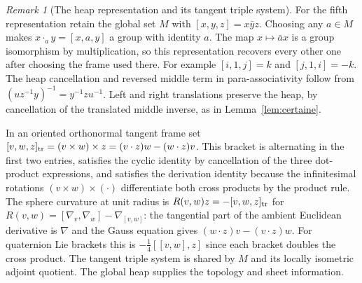 \documentclass[11pt,reqno]{amsart}
\theoremstyle{definition}
\theoremstyle{remark}
\newtheorem{remark}[theorem]{Remark}
\numberwithin{equation}{section}
\newcommand{\hp}[3]{[#1,#2,#3]}
\begin{document}
\begin{remark}[The heap representation and its tangent triple system]\label{m4:heap}
For the fifth representation retain the global set $M$ with $\hp xyz=x\bar yz$. Choosing any $a\in M$ makes $x\cdot_a y=\hp xay$ a group with identity $a$. The map $x\mapsto\bar a x$ is a group isomorphism by multiplication, so this representation recovers every other one after choosing the frame used there. For example $\hp i1j=k$ and $\hp j1i=-k$. The heap cancellation and reversed middle term in para-associativity follow from $(u z^{-1}y)^{-1}=y^{-1}zu^{-1}$. Left and right translations preserve the heap, by cancellation of the translated middle inverse, as in Lemma~\ref{lem:certaine}.

In an oriented orthonormal tangent frame set $[v,w,z]_{\rm tr}=(v\times w)\times z=(v\cdot z)w-(w\cdot z)v$. This bracket is alternating in the first two entries, satisfies the cyclic identity by cancellation of the three dot-product expressions, and satisfies the derivation identity because the infinitesimal rotations $(v\times w)\times(\cdot)$ differentiate both cross products by the product rule. The sphere curvature at unit radius is $R(v,w)z=-[v,w,z]_{\rm tr}$ for $R(v,w)=[\nabla_v,\nabla_w]-\nabla_{[v,w]}$: the tangential part of the ambient Euclidean derivative is $\nabla$ and the Gauss equation gives $(w\cdot z)v-(v\cdot z)w$. For quaternion Lie brackets this is $-\tfrac14[[v,w],z]$ since each bracket doubles the cross product. The tangent triple system is shared by $M$ and its locally isometric adjoint quotient. The global heap supplies the topology and sheet information.
\end{remark}
\end{document}
